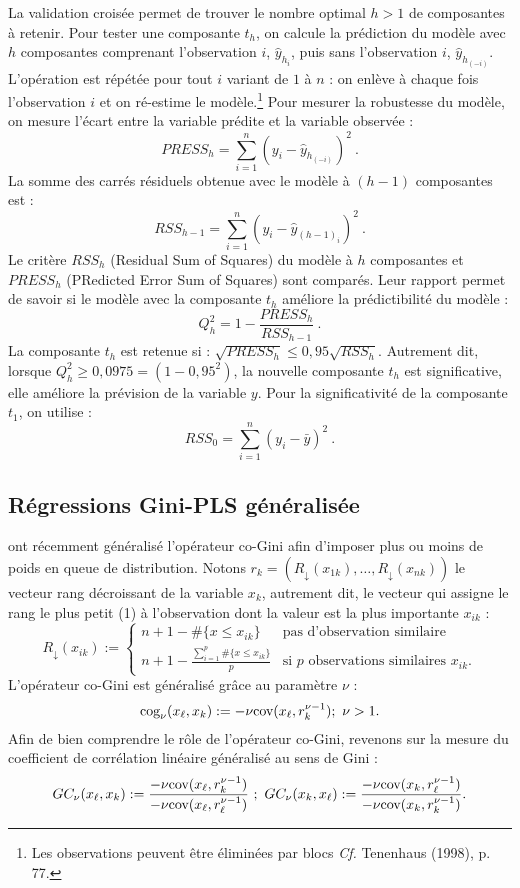 La validation croisée permet de trouver le nombre optimal $h>1$ de composantes à retenir. Pour tester une composante $t_h$, on calcule la prédiction du modèle avec $h$ composantes comprenant l'observation $i$, $\hat{y}_{h_i}$, puis sans l'observation $i$, $\hat{y}_{h_{(-i)}}$. L'opération est répétée pour tout $i$ variant de $1$ à $n$ : on enlève à chaque fois l'observation $i$ et on ré-estime le modèle.\footnote{Les observations peuvent être éliminées par blocs \emph{Cf.} Tenenhaus (1998), p. 77.} Pour mesurer la robustesse du modèle, on mesure l'écart entre la variable prédite et la variable observée :
\[
PRESS_h =  \sum\limits_{i=1}^n\left(y_i - \hat{y}_{h_{(-i)}}\right)^2 \ .
\]
La somme des carrés résiduels obtenue avec le modèle à $(h-1)$ composantes est : 
\[
RSS_{h-1} = \sum\limits_{i=1}^n \left(y_i - \hat{y}_{(h-1)_i}\right)^2 \ .
\]
Le critère $RSS_h$ (Residual Sum of Squares) du modèle à $h$ composantes et $PRESS_h$ (PRedicted Error Sum of Squares) sont comparés. Leur rapport permet de savoir si le modèle avec la composante $t_h$ améliore la prédictibilité du modèle :
\[
Q^2_h =1 - \frac{PRESS_h}{RSS_{h-1}} \ .
\]
La composante $t_h$ est retenue si : $\sqrt{PRESS_h} \leq 0,95 \sqrt{RSS_h}$. Autrement dit, lorsque $Q^2_h \geq 0,0975 = (1 - 0,95^2)$, la nouvelle composante $t_h$ est significative, elle améliore la prévision de la variable $y$. Pour la significativité de la  composante $t_1$, on utilise :
\[
RSS_0 = \sum^{n}_{i = 1} \left(y_i - \bar{y}\right)^2  \ .
\]


\subsection{Régressions Gini-PLS généralisée} 

\citet{Schechtman03} ont récemment généralisé l'opérateur co-Gini afin d'imposer plus ou moins de poids en queue de distribution. Notons $r_{k}=(R_\downarrow(x_{1k}),\ldots, R_\downarrow(x_{nk}))$ le vecteur rang décroissant de la variable $x_k$, autrement dit, le vecteur qui assigne le rang le plus petit (1) à l'observation dont la valeur est la plus importante $x_{ik}$ :
\[
R_\downarrow(x_{ik}) :=
\left\{ \begin{array}{ll}
n+1- \#\{x \leq x_{ik} \} & \text{pas d'observation similaire} \\
n+1-\frac{\sum_{i=1}^p \#\{ x \leq x_{ik}  \}}{p} & \text{si $p$ observations similaires $x_{ik}$.}
\end{array}
\right.
\]
L'opérateur co-Gini est généralisé grâce au paramètre $\nu$ :
\begin{equation}\label{cogg}
\text{cog}_\nu(x_\ell,x_k) := -\nu \text{cov}(x_\ell,r_{k}^{\nu-1}) ;  \ \nu > 1.
\end{equation}
Afin de bien comprendre le rôle de l'opérateur co-Gini, revenons sur la mesure du coefficient de corrélation linéaire généralisé au sens de Gini :
\[
GC_\nu(x_\ell,x_k) := \frac{-\nu \text{cov}(x_\ell,r_{k}^{\nu-1})}{-\nu \text{cov}(x_\ell,r_{\ell}^{\nu-1})} \ ; \ GC_\nu(x_k,x_\ell) := \frac{-\nu \text{cov}(x_k,r_{\ell}^{\nu-1})}{-\nu \text{cov}(x_k,r_{k}^{\nu-1})}.
\]

